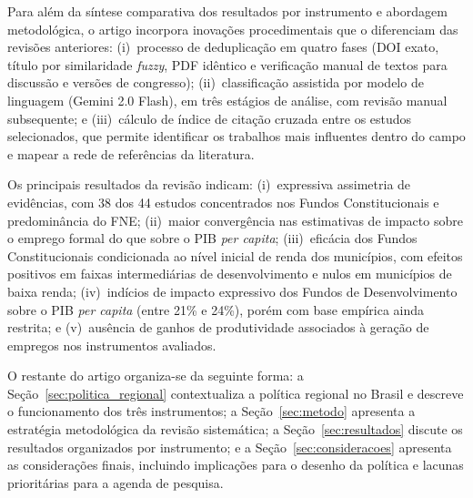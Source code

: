 Para além da síntese comparativa dos resultados por instrumento e abordagem metodológica, o artigo incorpora inovações procedimentais que o diferenciam das revisões anteriores: (i)~processo de deduplicação em quatro fases (DOI exato, título por similaridade \textit{fuzzy}, PDF idêntico e verificação manual de textos para discussão e versões de congresso); (ii)~classificação assistida por modelo de linguagem (Gemini 2.0 Flash), em três estágios de análise, com revisão manual subsequente; e (iii)~cálculo de índice de citação cruzada entre os estudos selecionados, que permite identificar os trabalhos mais influentes dentro do campo e mapear a rede de referências da literatura.

Os principais resultados da revisão indicam: (i)~expressiva assimetria de evidências, com 38 dos 44 estudos concentrados nos Fundos Constitucionais e predominância do FNE; (ii)~maior convergência nas estimativas de impacto sobre o emprego formal do que sobre o PIB \textit{per capita}; (iii)~eficácia dos Fundos Constitucionais condicionada ao nível inicial de renda dos municípios, com efeitos positivos em faixas intermediárias de desenvolvimento e nulos em municípios de baixa renda; (iv)~indícios de impacto expressivo dos Fundos de Desenvolvimento sobre o PIB \textit{per capita} (entre 21\% e 24\%), porém com base empírica ainda restrita; e (v)~ausência de ganhos de produtividade associados à geração de empregos nos instrumentos avaliados.

O restante do artigo organiza-se da seguinte forma: a Seção~\ref{sec:politica_regional} contextualiza a política regional no Brasil e descreve o funcionamento dos três instrumentos; a Seção~\ref{sec:metodo} apresenta a estratégia metodológica da revisão sistemática; a Seção~\ref{sec:resultados} discute os resultados organizados por instrumento; e a Seção~\ref{sec:consideracoes} apresenta as considerações finais, incluindo implicações para o desenho da política e lacunas prioritárias para a agenda de pesquisa.
